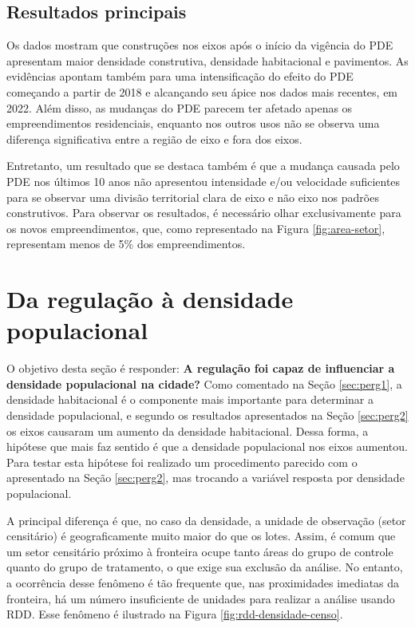




\subsection{Resultados principais}

Os dados mostram que construções nos eixos após o início da vigência do PDE apresentam maior densidade construtiva, densidade habitacional e pavimentos. As evidências apontam também para uma intensificação do efeito do PDE começando a partir de 2018 e alcançando seu ápice nos dados mais recentes, em 2022. Além disso, as mudanças do PDE parecem ter afetado apenas os empreendimentos residenciais, enquanto nos outros usos não se observa uma diferença significativa entre a região de eixo e fora dos eixos.

Entretanto, um resultado que se destaca também é que a mudança causada pelo PDE nos últimos 10 anos não apresentou intensidade e/ou velocidade suficientes para se observar uma divisão territorial clara de eixo e não eixo nos padrões construtivos. Para observar os resultados, é necessário olhar exclusivamente para os novos empreendimentos, que, como representado na Figura \ref{fig:area-setor}, representam menos de 5\% dos empreendimentos.


\section{Da regulação à densidade populacional}
\label{sec:perg3}

O objetivo desta seção é responder: \textbf{A regulação foi capaz de influenciar a densidade populacional na cidade?} Como comentado na Seção \ref{sec:perg1}, a densidade habitacional é o componente mais importante para determinar a densidade populacional, e segundo os resultados apresentados na Seção \ref{sec:perg2} os eixos causaram um aumento da densidade habitacional. Dessa forma, a hipótese que mais faz sentido é que a densidade populacional nos eixos aumentou. Para testar esta hipótese foi realizado um procedimento parecido com o apresentado na Seção \ref{sec:perg2}, mas trocando a variável resposta por densidade populacional.

A principal diferença é que, no caso da densidade, a unidade de observação (setor censitário) é geograficamente muito maior do que os lotes. Assim, é comum que um setor censitário próximo à fronteira ocupe tanto áreas do grupo de controle quanto do grupo de tratamento, o que exige sua exclusão da análise. No entanto, a ocorrência desse fenômeno é tão frequente que, nas proximidades imediatas da fronteira, há um número insuficiente de unidades para realizar a análise usando RDD. Esse fenômeno é ilustrado na Figura \ref{fig:rdd-densidade-censo}. 

